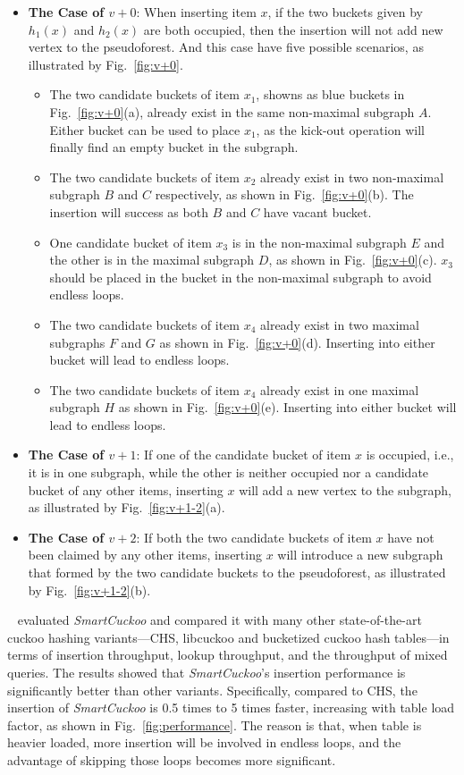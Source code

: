 \documentclass[12pt,conference,compsoc]{IEEEtran}
\begin{document}
\begin{itemize}
    \item \textbf{The Case of $v+0$}: When inserting item $x$, if the two buckets given by $h_1(x)$ and $h_2(x)$ are both occupied, then the insertion will not add new vertex to the pseudoforest. And this case have five possible scenarios, as illustrated by Fig.~\ref{fig:v+0}.
    \begin{itemize}
        \item The two candidate buckets of item $x_1$, showns as blue buckets in Fig.~\ref{fig:v+0}(a), already exist in the same non-maximal subgraph $A$. Either bucket can be used to place $x_1$, as the kick-out operation will finally find an empty bucket in the subgraph.
        \item The two candidate buckets of item $x_2$ already exist in two non-maximal subgraph $B$ and $C$ respectively, as shown in Fig.~\ref{fig:v+0}(b). The insertion will success as both $B$ and $C$ have vacant bucket.
        \item One candidate bucket of item $x_3$ is in the non-maximal subgraph $E$ and the other is in the maximal subgraph $D$, as shown in Fig.~\ref{fig:v+0}(c). $x_3$ should be placed in the bucket in the non-maximal subgraph to avoid endless loops.
        \item The two candidate buckets of item $x_4$ already exist in two maximal subgraphs $F$ and $G$ as shown in Fig.~\ref{fig:v+0}(d). Inserting into either bucket will lead to endless loops.
        \item The two candidate buckets of item $x_4$ already exist in one maximal subgraph $H$ as shown in Fig.~\ref{fig:v+0}(e). Inserting into either bucket will lead to endless loops.
    \end{itemize}
    \item \textbf{The Case of $v+1$}: If one of the candidate bucket of item $x$ is occupied, i.e., it is in one subgraph, while the other is neither occupied nor a candidate bucket of any other items, inserting $x$ will add a new vertex to the subgraph, as illustrated by Fig.~\ref{fig:v+1-2}(a).
    \item \textbf{The Case of $v+2$}: If both the two candidate buckets of item $x$ have not been claimed by any other items, inserting $x$ will introduce a new subgraph that formed by the two candidate buckets to the pseudoforest, as illustrated by Fig.~\ref{fig:v+1-2}(b).
\end{itemize}

~\cite{SmartCuckoo} evaluated \textit{SmartCuckoo} and compared it with many other state-of-the-art cuckoo hashing variants---CHS, libcuckoo and bucketized cuckoo hash tables---in terms of insertion throughput, lookup throughput, and the throughput of mixed queries. The results showed that \textit{SmartCuckoo}'s insertion performance is significantly better than other variants. Specifically, compared to CHS, the insertion of \textit{SmartCuckoo} is 0.5 times to 5 times faster, increasing with table load factor, as shown in Fig.~\ref{fig:performance}. The reason is that, when table is heavier loaded, more insertion will be involved in endless loops, and the advantage of skipping those loops becomes more significant.
\end{document}
